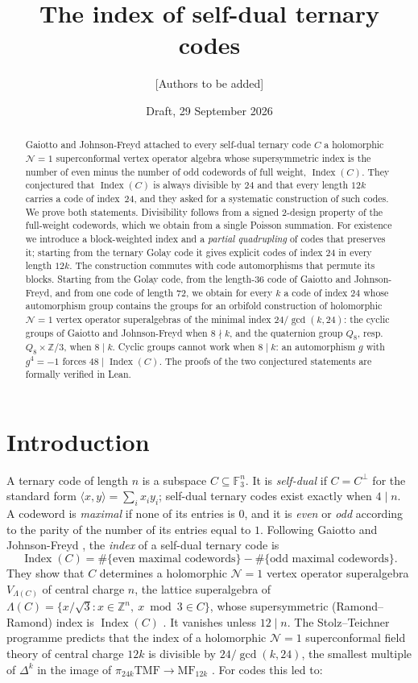 \documentclass[11pt]{amsart}
\title{The index of self-dual ternary codes}
\author{[Authors to be added]}
\date{Draft, 29 September 2026}
\theoremstyle{definition}
\newcommand{\F}{\mathbb{F}_3}
\newcommand{\Z}{\mathbb{Z}}
\newcommand{\Index}{\operatorname{Index}}
\begin{document}
\begin{abstract}
Gaiotto and Johnson-Freyd attached to every self-dual ternary code $C$ a holomorphic
$\mathcal N=1$ superconformal vertex operator algebra whose supersymmetric index is the number of
even minus the number of odd codewords of full weight, $\Index(C)$. They conjectured that
$\Index(C)$ is always divisible by $24$ and that every length $12k$ carries a code of index~$24$, and
they asked for a systematic construction of such codes. We prove both statements. Divisibility
follows from a signed $2$-design property of the full-weight codewords, which we obtain from a
single Poisson summation. For existence we introduce a block-weighted index and a \emph{partial
quadrupling} of codes that preserves it; starting from the ternary Golay code it gives explicit
codes of index $24$ in every length $12k$. The construction commutes with code automorphisms that
permute its blocks. Starting from the Golay code, from the length-$36$ code of Gaiotto and
Johnson-Freyd, and from one code of length $72$, we obtain for every $k$ a code of index $24$ whose
automorphism group contains the groups for an orbifold construction of holomorphic $\mathcal N=1$
vertex operator superalgebras of the minimal index $24/\gcd(k,24)$: the cyclic groups of Gaiotto and
Johnson-Freyd when $8\nmid k$, and the quaternion group $Q_8$, resp.\ $Q_8\times\Z/3$, when $8\mid k$. Cyclic groups
cannot work when $8\mid k$: an automorphism $g$ with $g^4=-1$ forces $48\mid\Index(C)$. The proofs
of the two conjectured statements are formally verified in Lean.
\end{abstract}

\maketitle

\section{Introduction}

A ternary code of length $n$ is a subspace $C\subseteq\F^n$. It is \emph{self-dual} if $C=C^\perp$
for the standard form $\langle x,y\rangle=\sum_ix_iy_i$; self-dual ternary codes exist exactly when
$4\mid n$. A codeword is \emph{maximal} if none of its entries is $0$, and it is \emph{even} or
\emph{odd} according to the parity of the number of its entries equal to $1$. Following Gaiotto and
Johnson-Freyd \cite[\S1]{GJF}, the \emph{index} of a self-dual ternary code is
\[
  \Index(C)=\#\{\text{even maximal codewords}\}-\#\{\text{odd maximal codewords}\}.
\]
They show that $C$ determines a holomorphic $\mathcal N=1$ vertex operator superalgebra
$V_{\Lambda(C)}$ of central charge $n$, the lattice superalgebra of
$\Lambda(C)=\{x/\sqrt3: x\in\Z^n,\ x\bmod3\in C\}$, whose supersymmetric (Ramond--Ramond) index is
$\Index(C)$ \cite[Prop.~2.4]{GJF}. It vanishes unless $12\mid n$. The Stolz--Teichner programme
predicts that the index of a holomorphic $\mathcal N=1$ superconformal field theory of central
charge $12k$ is divisible by $24/\gcd(k,24)$, the smallest multiple of $\Delta^k$ in the image of
$\pi_{24k}\mathrm{TMF}\to\mathrm{MF}_{12k}$ \cite[Prop.~4.6]{Hopkins}. For codes this led to:
\end{document}
